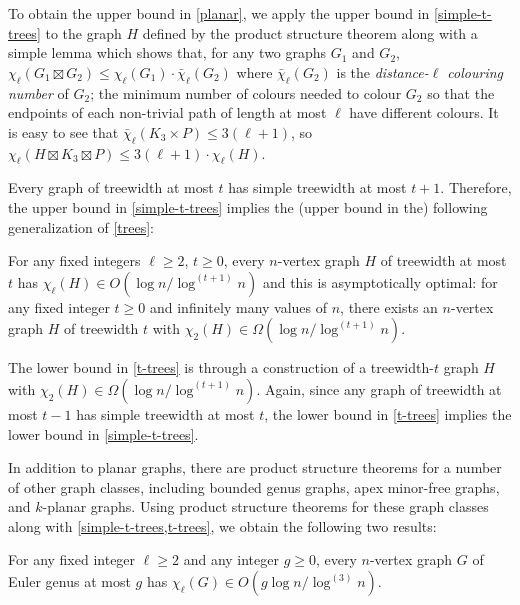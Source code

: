 \documentclass[kpfonts]{patmorin}
\newcommand{\trn}{\chi_2}
\newcommand{\lrn}{\chi_{\ell}}
\newcommand{\dlcn}{\bar{\chi}_\ell}
\theoremstyle{named}
\begin{document}
To obtain the upper bound in \cref{planar}, we apply the upper bound in \cref{simple-t-trees} to the graph $H$ defined by the product structure theorem along with a simple lemma which shows that, for any two graphs $G_1$ and $G_2$, $\lrn(G_1\boxtimes G_2)\le \lrn(G_1)\cdot\dlcn(G_2)$ where $\dlcn(G_2)$ is the \emph{distance-$\ell$ colouring number} of $G_2$;  the minimum number of colours needed to colour $G_2$ so that the endpoints of each non-trivial path of length at most $\ell$ have different colours.  It is easy to see that $\dlcn(K_3\times P)\le 3(\ell+1)$, so $\lrn(H\boxtimes K_3\boxtimes P)\le 3(\ell+1)\cdot\lrn(H)$.

Every graph of treewidth at most $t$ has simple treewidth at most $t+1$. Therefore, the upper bound in \cref{simple-t-trees} implies the (upper bound in the) following generalization of \cref{trees}:

\begin{thm}\label{t-trees}
    For any fixed integers $\ell\ge 2$, $t\ge 0$, every $n$-vertex graph $H$ of treewidth at most $t$ has $\lrn(H) \in O(\log n/\log^{(t+1)} n)$ and this is asymptotically optimal: for any fixed integer $t\ge 0$ and infinitely many values of $n$, there exists an $n$-vertex graph $H$ of treewidth $t$ with $\trn(H)\in\Omega(\log n/\log^{(t+1)} n)$.
\end{thm}

The lower bound in \cref{t-trees} is through a construction of a treewidth-$t$ graph $H$ with $\trn(H)\in\Omega(\log n/\log^{(t+1)} n)$.  Again, since any graph of treewidth at most $t-1$ has simple treewidth at most $t$, the lower bound in \cref{t-trees} implies the lower bound in \cref{simple-t-trees}.

In addition to planar graphs, there are product structure theorems for a number of other graph classes, including bounded genus graphs, apex minor-free graphs, and $k$-planar graphs.  Using product structure theorems for these graph classes along with \cref{simple-t-trees,t-trees}, we obtain the following two results:

\begin{thm}\label{bounded-genus}
    For any fixed integer $\ell\ge 2$ and any integer $g\ge 0$, every $n$-vertex graph $G$ of Euler genus at most $g$ has $\lrn(G)\in O(g\log n/\log^{(3)} n)$.
\end{thm}
\end{document}
